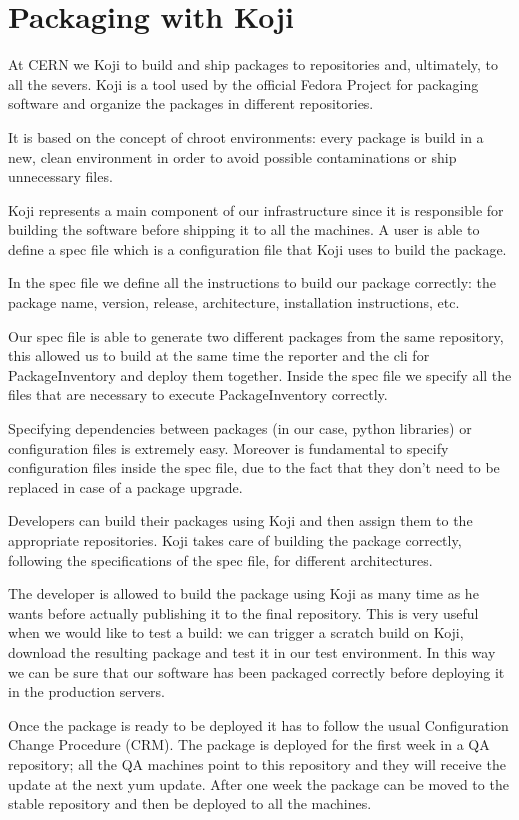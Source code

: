 \section{Packaging with Koji}

At CERN we Koji to build and ship packages to repositories and,
ultimately, to all the severs. Koji is a tool used by the official Fedora
Project \cite{FedoraProject} for packaging software and organize the
packages in different repositories.

It is based on the concept of chroot environments: every package is build
in a new, clean environment in order to avoid possible contaminations or
ship unnecessary files.

Koji represents a main component of our infrastructure since it is
responsible for building the software before shipping it to all the
machines. A user is able to define a spec file which is a configuration
file that Koji uses to build the package.

In the spec file we define all the instructions to build our package
correctly: the package name, version, release, architecture, installation
instructions, etc.

Our spec file is able to generate two different packages from the same
repository, this allowed us to build at the same time the reporter and the
cli for PackageInventory and deploy them together. Inside the spec file we
specify all the files that are necessary to execute PackageInventory
correctly.

Specifying dependencies between packages (in our case, python libraries)
or configuration files is extremely easy. Moreover is fundamental to
specify configuration files inside the spec file, due to the fact that
they don't need to be replaced in case of a package upgrade.

Developers can build their packages using Koji and then assign them to the
appropriate repositories. Koji takes care of building the package
correctly, following the specifications of the spec file, for different
architectures.

The developer is allowed to build the package using Koji as many time as
he wants before actually publishing it to the final repository. This is
very useful when we would like to test a build: we can trigger a scratch
build on Koji, download the resulting package and test it in our test
environment. In this way we can be sure that our software has been
packaged correctly before deploying it in the production servers.

Once the package is ready to be deployed it has to follow the usual
Configuration Change Procedure (CRM). The package is deployed for the
first week in a QA repository; all the QA machines point to this
repository and they will receive the update at the next yum update. After
one week the package can be moved to the stable repository and then be
deployed to all the machines.

